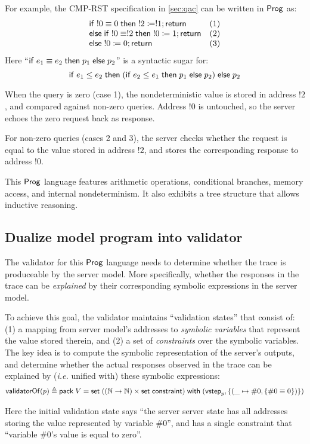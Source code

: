 For example, the CMP-RST specification in \autoref{sec:qac} can be written in
$\mathsf{Prog}$ as:
\[\begin{array}{ll}
\mathsf{if}\; !0\equiv0\;\mathsf{then}\; !2\coloneqq!1;\mathsf{return}&(1)\\
\mathsf{else}\;\mathsf{if}\; !0\equiv!2\;\mathsf{then}\;!0\coloneqq1;\mathsf{return}&(2)\\
\mathsf{else}\;!0\coloneqq0;\mathsf{return}&(3)
\end{array}\]
Here ``$\mathsf{if}\; e_1\equiv e_2\;\mathsf{then}\; p_1\;\mathsf{else}\; p_2$'' is a syntactic sugar for:
\[\mathsf{if}\; e_1\le e_2\;\mathsf{then}\;(\mathsf{if}\; e_2\le e_1\;\mathsf{then}\; p_1\;\mathsf{else}\; p_2)\;\mathsf{else}\; p_2\]

When the query is zero (case 1), the nondeterministic value is stored in address
$!2$, and compared against non-zero queries.  Address $!0$ is untouched, so the
server echoes the zero request back as response.

For non-zero queries (cases 2 and 3), the server checks whether the request is
equal to the value stored in address $!2$, and stores the corresponding response
to address $!0$.

This $\mathsf{Prog}$ language features arithmetic operations, conditional branches,
memory access, and internal nondeterminism.  It also exhibits a tree structure
that allows inductive reasoning.

\subsection{Dualize model program into validator}
The validator for this $\mathsf{Prog}$ language needs to determine whether the trace is
produceable by the server model.  More specifically, whether the responses in
the trace can be {\em explained} by their corresponding symbolic expressions in
the server model.

To achieve this goal, the validator maintains ``validation states'' that consist
of: (1) a mapping from server model's addresses to {\em symbolic variables} that
represent the value stored therein, and (2) a set of {\em constraints} over the
symbolic variables.  The key idea is to compute the symbolic representation of
the server's outputs, and determine whether the actual responses observed in the
trace can be explained by ({\it i.e.} unified with) these symbolic expressions:
\[\mathsf{validatorOf}(p)\triangleq\mathsf{pack}\;V=\mathsf{set}\;((\mathbb N\to\mathbb N)\times\mathsf{set}\;\mathsf{constraint})\;\mathsf{with}\;(\mathsf{vstep}_p,\{(\_\mapsto\#0,\{\#0\equiv0\})\})\]

Here the initial validation state says ``the server server state has all
addresses storing the value represented by variable $\#0$'', and has a single
constraint that ``variable $\#0$'s value is equal to zero''.

